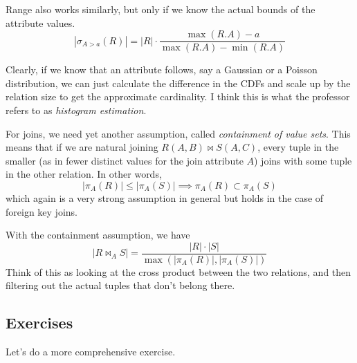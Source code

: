     \begin{example}
      \label{ex:range-predicates}
      Range also works similarly, but only if we know the actual bounds of the attribute values.  
      \begin{equation}
        |\sigma_{A > a} (R)| = |R| \cdot \frac{\max(R.A) - a}{\max(R.A) - \min(R.A)}
      \end{equation}
    \end{example}

    Clearly, if we know that an attribute follows, say a Gaussian or a Poisson distribution, we can just calculate the difference in the CDFs and scale up by the relation size to get the approximate cardinality. I think this is what the professor refers to as \textit{histogram estimation}. 

    For joins, we need yet another assumption, called \textit{containment of value sets}. This means that if we are natural joining $R(A, B) \bowtie S(A, C)$, every tuple in the smaller (as in fewer distinct values for the join attribute $A$) joins with some tuple in the other relation. In other words, 
    \begin{equation}
      |\pi_A (R)| \leq |\pi_A (S)| \implies \pi_A (R) \subset \pi_A (S)
    \end{equation}
    which again is a very strong assumption in general but holds in the case of foreign key joins. 

    \begin{example}
      \label{ex:two-way-equi-join}
 
      With the containment assumption, we have 
      \begin{equation}
        |R \bowtie_{A} S| = \frac{|R| \cdot |S|}{\max( |\pi_A (R)|, |\pi_A(S)|)}
      \end{equation} 
      Think of this as looking at the cross product between the two relations, and then filtering out the actual tuples that don't belong there.  
    \end{example}

\subsection{Exercises} 

  Let's do a more comprehensive exercise. 

